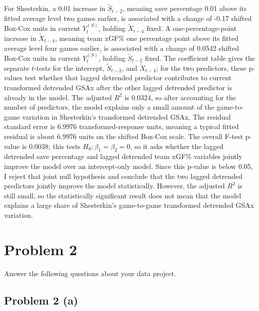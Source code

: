 \documentclass[
  10pt,
]{extarticle}
\begin{document}
For Shesterkin, a 0.01 increase in \(\tilde{S}_{t-2}\), meaning save percentage 0.01 above its fitted average level two games earlier, is associated with a change of -0.17 shifted Box-Cox units in current \(Y^{(S)}_t\), holding \(\tilde{X}_{t-4}\) fixed. A one-percentage-point increase in \(\tilde{X}_{t-4}\), meaning team xGF\% one percentage point above its fitted average level four games earlier, is associated with a change of 0.0542 shifted Box-Cox units in current \(Y^{(S)}_t\), holding \(\tilde{S}_{t-2}\) fixed. The coefficient table gives the separate \(t\)-tests for the intercept, \(\tilde{S}_{t-2}\), and \(\tilde{X}_{t-4}\); for the two predictors, these p-values test whether that lagged detrended predictor contributes to current transformed detrended GSAx after the other lagged detrended predictor is already in the model. The adjusted \(R^2\) is 0.0324, so after accounting for the number of predictors, the model explains only a small amount of the game-to-game variation in Shesterkin's transformed detrended GSAx. The residual standard error is 6.9976 transformed-response units, meaning a typical fitted residual is about 6.9976 units on the shifted Box-Cox scale. The overall F-test p-value is 0.0038; this tests \(H_0:\beta_1=\beta_2=0\), so it asks whether the lagged detrended save percentage and lagged detrended team xGF\% variables jointly improve the model over an intercept-only model. Since this p-value is below 0.05, I reject that joint null hypothesis and conclude that the two lagged detrended predictors jointly improve the model statistically. However, the adjusted \(R^2\) is still small, so the statistically significant result does not mean that the model explains a large share of Shesterkin's game-to-game transformed detrended GSAx variation.

\newpage

\section{Problem 2}\label{problem-2}

\begin{problem}[Problem 2]
Answer the following questions about your data project.
\end{problem}

\newpage

\subsection{Problem 2 (a)}\label{problem-2-a}
\end{document}
